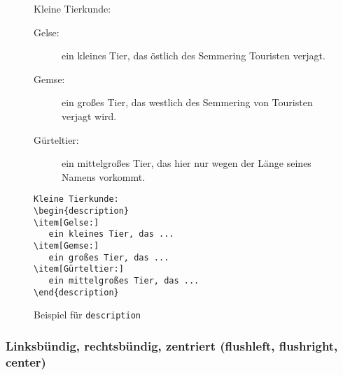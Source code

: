 \begin{figure}[!htbp]  %
\begin{lminipage}{\textwidth}
\exa
Kleine Tierkunde:
\begin{description}
\item[Gelse:]
   ein kleines Tier, das
   östlich des Semmering Touristen verjagt.
\item[Gemse:]
   ein großes Tier, das
   westlich des Semmering von Touristen verjagt wird.
\item[Gürteltier:]
   ein mittelgroßes Tier, das
   hier nur wegen der Länge seines Namens vorkommt.
\end{description}
\exb
\begin{verbatim}
Kleine Tierkunde:
\begin{description}
\item[Gelse:]
   ein kleines Tier, das ...
\item[Gemse:]
   ein großes Tier, das ...
\item[Gürteltier:]
   ein mittelgroßes Tier, das ...
\end{description}
\end{verbatim}
\exc
\end{lminipage}
\caption{Beispiel für \texttt{description}} \label{desc}
\end{figure}
 
{\hfuzz=2pt\relax %
\subsubsection
          [Flattersatz (flush\-left, flush\-right, center)]
          {Linksbündig, rechtsbündig, zentriert
                       (flush\-left, flush\-right, center)}
}

